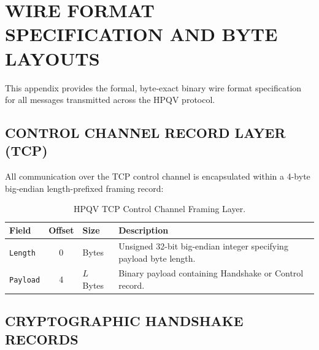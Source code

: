 \chapter{WIRE FORMAT SPECIFICATION AND BYTE LAYOUTS}
\label{app:wireformat}

This appendix provides the formal, byte-exact binary wire format specification for all messages transmitted across the HPQV protocol.

\section{CONTROL CHANNEL RECORD LAYER (TCP)}
All communication over the TCP control channel is encapsulated within a 4-byte big-endian length-prefixed framing record:

\begin{table}[htbp]
    \centering
    \caption{HPQV TCP Control Channel Framing Layer.}
    \label{tab:tcp_framing_layout}
    \begin{tabularx}{\textwidth}{>{\raggedright\arraybackslash}p{2.5cm} c >{\raggedright\arraybackslash}p{2.5cm} >{\raggedright\arraybackslash}X}
        \toprule
        \textbf{Field} & \textbf{Offset} & \textbf{Size} & \textbf{Description} \\
        \midrule
        \texttt{Length} & 0 & 4 Bytes & Unsigned 32-bit big-endian integer specifying payload byte length. \\
        \texttt{Payload} & 4 & $L$ Bytes & Binary payload containing Handshake or Control record. \\
        \bottomrule
    \end{tabularx}
\end{table}

\section{CRYPTOGRAPHIC HANDSHAKE RECORDS}

